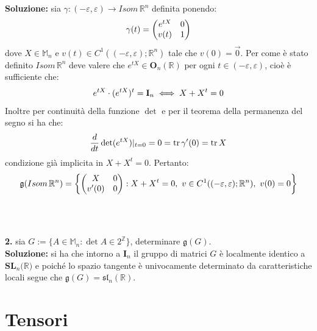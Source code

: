 \documentclass{article}
\begin{document}
\textbf{Soluzione:} sia $\gamma : (- \varepsilon, \varepsilon) \longrightarrow Isom\, \mathbb{R}^n$ definita ponendo:
\begin{equation} \gamma (t) =
    \begin{pmatrix}
        e^{tX} & 0 \\
        v(t) & 1
    \end{pmatrix} \notag
\end{equation}
dove $X \in \mathbb{M}_n$ e $v(t) \in C^1((-\varepsilon, \varepsilon);\mathbb{R}^n)$ tale che $v(0) = \vec{0}$. Per come è stato definito $Isom\, \mathbb{R}^n$ deve valere che $e^{tX} \in \mathbf{O}_n(\mathbb{R})$ per ogni $t \in (-\varepsilon, \varepsilon)$, cioè è sufficiente che:
\begin{gather}
    e^{tX} \cdot (e^{tX})^t = \mathbf{I}_n \iff X + X^t = 0 \notag
\end{gather}
Inoltre per continuità della funzione $\det$ e per il teorema della permanenza del segno si ha che:
\begin{gather}
    \frac{d}{dt} \det (e^{tX})|_{t=0} = 0 = \mathrm{tr}\, \gamma'(0) = \mathrm{tr}\, X \notag
\end{gather}
condizione già implicita in $X + X^t = 0$. Pertanto:
\begin{equation}
    \mathfrak{g}(Isom\, \mathbb{R}^n) = \left\{
    \begin{pmatrix}
        X & 0 \\
        v'(0) & 0
    \end{pmatrix} : X + X^t = 0, \ v \in C^1((-\varepsilon, \varepsilon); \mathbb{R}^n), \ v(0) = 0\right\} \notag
\end{equation}
\\ \\ \\
\textbf{2.} sia $G := \{ A \in \mathbb{M}_n : \det A \in 2^{\mathbb{Z}}\}$, determinare $\mathfrak{g}(G)$. \\

\textbf{Soluzione:} si ha che intorno a $\mathbf{I}_n$ il gruppo di matrici $G$ è localmente identico a $\mathbf{SL}_n(\mathbb{R)}$ e poiché lo spazio tangente è univocamente determinato da caratteristiche locali segue che $\mathfrak{g}(G) = \mathfrak{sl}_n(\mathbb{R})$.

\newpage
\section{Tensori}
\end{document}
